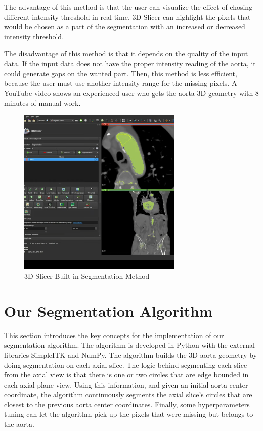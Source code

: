The advantage of this method is that the user can visualize the effect of chosing different intensity threshold in real-time. 3D Slicer can highlight the pixels that would be chosen as a part of the segmentation with an increased or decreased intensity threshold.

The disadvantage of this method is that it depends on the quality of the input data. If the input data does not have the proper intensity reading of the aorta, it could generate gaps on the wanted part. Then, this method is less efficient, because the user must use another intensity range for the missing pixels. A \href{https://www.youtube.com/watch?v=5_673cHMBiY}{YouTube video} shows an experienced user who gets the aorta 3D geometry with 8 minutes of manual work. 

\begin{figure}[H]
    \centering
    \includegraphics[width=0.7\textwidth]{figures/Sample/3D-Slicer-Segmentation.png}
    \caption[3D Slicer Built-in Segmentation UI]{3D Slicer Built-in Segmentation Method \cite{Kikinis2014}}
    \label{fig_3D_Seg_Builtin}
\end{figure}

\section{Our Segmentation Algorithm}

This section introduces the key concepts for the implementation of our segmentation algorithm. The algorithm is developed in Python with the external libraries SimpleITK and NumPy. The algorithm builds the 3D aorta geometry by doing segmentation on each axial slice. The logic behind segmenting each slice from the axial view is that there is one or two circles that are edge bounded in each axial plane view. Using this information, and given an initial aorta center coordinate, the algorithm continuously segments the axial slice's circles that are closest to the previous aorta center coordinates. Finally, some hyperparameters tuning can let the algorithm pick up the pixels that were missing but belongs to the aorta.

